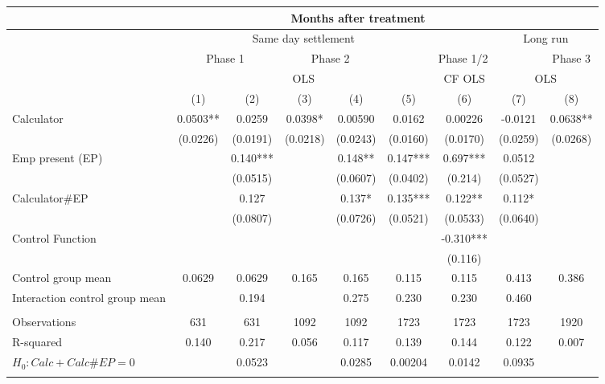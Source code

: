 \begin{tabular}{lcccccccc}
\toprule
\multicolumn{1}{|r}{} & \multicolumn{7}{c}{Months after treatment}            &  \\
\midrule
\multicolumn{1}{r|}{} & \multicolumn{5}{c}{Same day settlement} & \multicolumn{1}{c|}{} & \multicolumn{2}{c}{Long run} \\
\midrule
\midrule
\multicolumn{1}{r|}{} & \multicolumn{2}{c|}{Phase 1} & \multicolumn{2}{c|}{Phase 2} & \multicolumn{3}{c|}{Phase 1/2} & Phase 3 \\
\midrule
\multicolumn{1}{r|}{} & \multicolumn{5}{c|}{OLS}              & \multicolumn{1}{c|}{CF OLS} & \multicolumn{2}{c}{OLS} \\
\midrule
\midrule
      & (1)   & (2)   & (3)   & (4)   & (5)   & (6)   & (7)   & (8) \\
Calculator  & 0.0503** & 0.0259 & 0.0398* & 0.00590 & 0.0162 & 0.00226 & -0.0121 & 0.0638** \\
      & (0.0226) & (0.0191) & (0.0218) & (0.0243) & (0.0160) & (0.0170) & (0.0259) & (0.0268) \\
Emp present (EP) &       & 0.140*** &       & 0.148** & 0.147*** & 0.697*** & 0.0512 &  \\
      &       & (0.0515) &       & (0.0607) & (0.0402) & (0.214) & (0.0527) &  \\
Calculator\#EP &       & 0.127 &       & 0.137* & 0.135*** & 0.122** & 0.112* &  \\
      &       & (0.0807) &       & (0.0726) & (0.0521) & (0.0533) & (0.0640) &  \\
Control Function &       &       &       &       &       & -0.310*** &       &  \\
      &       &       &       &       &       & (0.116) &       &  \\
\midrule
Control group mean & 0.0629 & 0.0629 & 0.165 & 0.165 & 0.115 & 0.115 & 0.413 & 0.386 \\
Interaction control group mean &       & 0.194 &       & 0.275 & 0.230 & 0.230 & 0.460 &  \\
\midrule
      &       &       &       &       &       &       &       &  \\
\midrule
Observations & 631   & 631   & 1092  & 1092  & 1723  & 1723  & 1723  & 1920 \\
R-squared & 0.140 & 0.217 & 0.056 & 0.117 & 0.139 & 0.144 & 0.122 & 0.007 \\
$H_0 : Calc + Calc\# EP = 0$ &       & 0.0523 &       & 0.0285 & 0.00204 & 0.0142 & 0.0935 &  \\
\midrule
\midrule
      &       &       &       &       &       &       &       &  \\
\midrule
\midrule
\end{tabular}%
